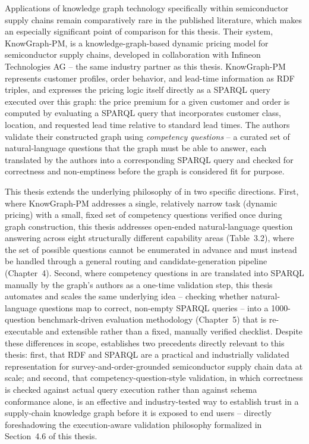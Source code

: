 \documentclass[
  12pt,
  english,
  oneside]{report}
\begin{document}
Applications of knowledge graph technology specifically within
semiconductor supply chains remain comparatively rare in the published
literature, which makes \citet{ramzy2021knowgraphpm} an especially
significant point of comparison for this thesis. Their system,
KnowGraph-PM, is a knowledge-graph-based dynamic pricing model for
semiconductor supply chains, developed in collaboration with Infineon
Technologies AG -- the same industry partner as this thesis. KnowGraph-PM
represents customer profiles, order behavior, and lead-time information as
RDF triples, and expresses the pricing logic itself directly as a SPARQL
query executed over this graph: the price premium for a given customer and
order is computed by evaluating a SPARQL query that incorporates customer
class, location, and requested lead time relative to standard lead times.
The authors validate their constructed graph using \emph{competency
questions} -- a curated set of natural-language questions that the graph
must be able to answer, each translated by the authors into a corresponding
SPARQL query and checked for correctness and non-emptiness before the
graph is considered fit for purpose.

This thesis extends the underlying philosophy of \citet{ramzy2021knowgraphpm}
in two specific directions. First, where KnowGraph-PM addresses a single,
relatively narrow task (dynamic pricing) with a small, fixed set of
competency questions verified once during graph construction, this thesis
addresses open-ended natural-language question answering across eight
structurally different capability areas (Table~3.2), where the set of
possible questions cannot be enumerated in advance and must instead be
handled through a general routing and candidate-generation pipeline
(Chapter~4). Second, where competency questions in
\citet{ramzy2021knowgraphpm} are translated into SPARQL manually by the
graph's authors as a one-time validation step, this thesis automates and
scales the same underlying idea -- checking whether natural-language
questions map to correct, non-empty SPARQL queries -- into a
1000-question benchmark-driven evaluation methodology (Chapter~5) that is
re-executable and extensible rather than a fixed, manually verified
checklist. Despite these differences in scope, \citet{ramzy2021knowgraphpm}
establishes two precedents directly relevant to this thesis: first, that
RDF and SPARQL are a practical and industrially validated representation
for survey-and-order-grounded semiconductor supply chain data at scale;
and second, that competency-question-style validation, in which
correctness is checked against actual query execution rather than against
schema conformance alone, is an effective and industry-tested way to
establish trust in a supply-chain knowledge graph before it is exposed to
end users -- directly foreshadowing the execution-aware validation
philosophy formalized in Section~4.6 of this thesis.
\end{document}
